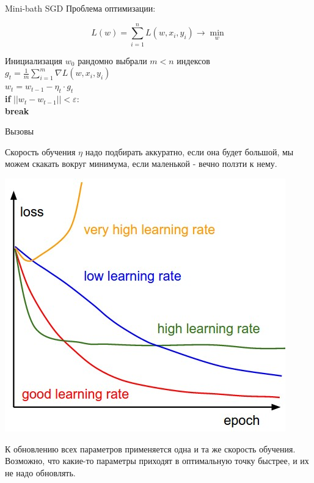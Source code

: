 \documentclass[notes,12pt, aspectratio=169]{beamer}
\newcommand{\pgr}[1]{{\color{green} \textbf{#1}}}
\newenvironment{wideitemize}{\itemize\addtolength{\itemsep}{10pt}}{\enditemize}
\begin{document}
\begin{frame}[fragile]{Mini-bath SGD}
Проблема оптимизации: 

\[   
L(w) = \sum_{i=1}^n L(w, x_i, y_i) \to \min_{w}
\]

Инициализация $w_0$ 
\pgr{\hspace{15pt}} рандомно выбрали $m < n$ индексов \\
\pgr{\hspace{15pt}} $g_t =\frac{1}{m}\sum_{i=1}^m  \nabla L(w, x_i, y_i)$ \\
\pgr{\hspace{15pt}} $w_t = w _{t-1} - \eta_t \cdot g_t   $ \\
\pgr{\hspace{15pt} if} $||w_t - w_{t-1}|| < \varepsilon:$ \\
\pgr{\hspace{30pt} break}
\end{frame}


\begin{frame}[fragile]{Вызовы}
\begin{wideitemize}
\item Скорость обучения $\eta$ надо подбирать аккуратно, если она будет большой, мы можем скакать вокруг минимума, если маленькой - вечно ползти к нему.

\begin{center}
	\includegraphics[width=0.25\paperwidth]{learningrates.jpg}
\end{center}

\item К обновлению всех параметров применяется одна и та же скорость обучения. Возможно, что какие-то параметры приходят в оптимальную точку быстрее, и их не надо обновлять.
\end{wideitemize}
\end{frame}
\end{document}
